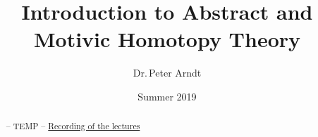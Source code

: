 \documentclass[twoside, a4paper]{report}
\title{Introduction to Abstract and Motivic Homotopy Theory}
\author{Dr.\,Peter Arndt}
\date{Summer 2019}
\begin{document}
	\maketitle
	
	\tableofcontents
	\begin{abstract} %
	-- TEMP --
		\href{https://www.youtube.com/playlist?reload=9&list=PLYShsxzWr0U3EZobFoA7sJcpjip8zXzui}{Recording of the lectures}
	\end{abstract}
	\newpage
	
	
	
	
	
\end{document}
